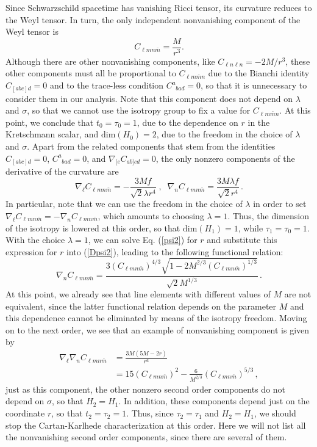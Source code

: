 \documentclass[twocolumn,prd,aps,showpacs,showkeys,amsmath,amssymb]{revtex4-1}
\begin{document}
Since Schwarzschild spacetime has vanishing Ricci tensor, its curvature reduces to the Weyl tensor. In turn, the only independent nonvanishing component of the Weyl tensor is
\begin{equation}\label{psi2}
  C_{\ell m  n \bar{m}} = \frac{M}{r^3} .
\end{equation}
Although there are other nonvanishing components, like $C_{\ell n\ell n} =-2M/r^3$, these other components must all be proportional to $C_{\ell m \bar{m} n}$ due to the Bianchi identity $C_{[abc]d}=0$ and to the trace-less condition $C^{a}_{\;\;bad}=0$, so that it is unnecessary to consider them in our analysis. Note that this component does not depend on $\lambda$ and $\sigma$, so that we cannot use the isotropy group to fix a value for $C_{\ell m \bar{m} n}$. At this point, we conclude that $t_0 = \tau_0= 1$, due to the dependence on $r$ in the Kretschmann scalar, and $\textrm{dim}(H_0) = 2$, due to the freedom in the choice of $\lambda$ and $\sigma$. Apart from the related components that stem from the identities $C_{[abc]d}=0$, $C^{a}_{\;\;bad}=0$, and $\nabla_{[e}C_{ab]cd}=0$, the only nonzero components of the derivative of the curvature are
\begin{equation}\label{Dpsi2}
  \nabla_\ell  C_{\ell m  n \bar{m}} = -\frac{3M f}{\sqrt{2} \lambda  r^4 } \;,\;\; \nabla_n  C_{\ell m n \bar{m} } = \frac{3M \lambda f}{\sqrt{2}r^4} \,.
\end{equation}
In particular, note that we can use the freedom in the choice of $\lambda$ in order to set $ \nabla_\ell  C_{\ell m  n \bar{m}} = -\nabla_n  C_{\ell m n \bar{m}}$, which amounts to choosing $\lambda=1$. Thus, the dimension of the isotropy is lowered at this order, so that $\textrm{dim}(H_1) = 1$, while $\tau_1=\tau_0=1$. With the choice  $\lambda=1$, we can solve Eq. (\ref{psi2}) for $r$ and substitute this expression for $r$ into (\ref{Dpsi2}), leading to the following functional relation:
\begin{equation*}\label{FunRelSch1}
  \nabla_n  C_{\ell m  n \bar{m}} = \frac{3(C_{\ell m n  \bar{m}})^{4/3}\sqrt{1-2  M^{2/3} (C_{\ell m  n \bar{m}})^{1/3}}}{ \sqrt{2} M^{1/3}}\,.
\end{equation*}
At this point, we already see that line elements with different values of $M$ are not equivalent, since the latter functional relation depends on the parameter $M$ and this dependence cannot be eliminated by means of the isotropy freedom. Moving on to the next order, we see that an example of nonvanishing component is given by
\begin{align*}
  \nabla_\ell \nabla_n  C_{\ell m  n \bar{m} } &= \frac{3M(5M-2r)}{r^6} \\
  &= 15 (C_{\ell m  n \bar{m}})^2 - \frac{6}{M^{2/3}}(C_{\ell m  n \bar{m}})^{5/3}\,,
\end{align*}
just as this component, the other nonzero second order components do not depend on $\sigma$, so that $H_2 = H_1$. In addition, these components depend just on the coordinate $r$, so that $t_2= \tau_2 =1$. Thus, since $\tau_2=\tau_1$ and $H_2=H_1$, we should stop the Cartan-Karlhede characterization at this order. Here we will not list all the nonvanishing second order components, since there are several of them.
\end{document}
